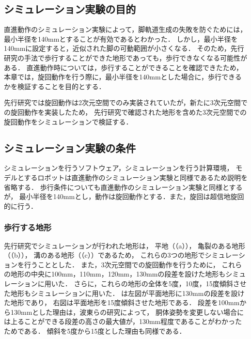 
\subsection{シミュレーション実験の目的}
直進動作のシミュレーション実験によって，脚軌道生成の失敗を防ぐためには，最小半径を140mmとすることが有効であるとわかった．
しかし，最小半径を140mmに設定すると，近似された脚の可動範囲が小さくなる．
そのため，先行研究の手法で歩行することができた地形であっても，歩行できなくなる可能性がある．
直進動作時については，歩行することができることを確認できたため，
本章では，旋回動作を行う際に，最小半径を140mmとした場合に，歩行できるかを検証することを目的とする．

先行研究では旋回動作は2次元空間でのみ実装されていたが，新たに3次元空間での旋回動作を実装したため，
先行研究で確認された地形を含めた3次元空間での旋回動作をシミュレーションで検証する．

\subsection{シミュレーション実験の条件}
シミュレーションを行うソフトウェア，シミュレーションを行う計算環境，
モデルとするロボットは直進動作のシミュレーション実験と同様であるため説明を省略する．
歩行条件についても直進動作のシミュレーション実験と同様とするが，
最小半径を140mmとし，動作は旋回動作とする．また，旋回は超信地旋回的に行う．

\subsubsection{歩行する地形}
先行研究でシミュレーションが行われた地形は，
平地（（a）），
亀裂のある地形（（b）），
溝のある地形（（c））であるため，
これらの3つの地形でシミュレーションを行うこととした．
また，3次元空間での旋回動作を行うために，
これらの地形の中央に100mm，110mm，120mm，130mmの段差を設けた地形もシミュレーションに用いた．
さらに，これらの地形の全体を5度，10度，15度傾斜させた地形もシミュレーションに用いた．
は左図が平面地形に130mmの段差を設けた地形であり，
右図は平面地形を15度傾斜させた地形である．
段差を100mmから130mmとした理由は，波東らの研究によって，
胴体姿勢を変更しない場合には上ることができる段差の高さの最大値が，130mm程度であることがわかったためである．
傾斜を5度から15度とした理由も同様である．

\newpage


